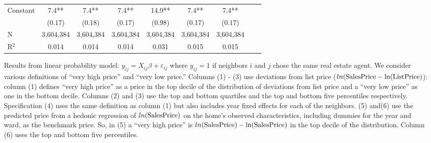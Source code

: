 \documentclass[AEJ,draftmode]{AEA}
\newcommand{\se}[1]{\footnotesize{(#1)}}
\begin{document}
\begin{sidewaystable}[ht]
\begin{tabular}{@{}lcccccccc@{}}
\multirow{2}{*}{Constant}                & 7.4**     & 7.4**     & 7.4**     & 14.9**    & 7.4**     & 7.4**\\
                                         & \se{0.17} & \se{0.18} & \se{0.17} & \se{0.98} & \se{0.17} & \se{0.17}\\\midrule
N                                        & 3,604,384 & 3,604,384 & 3,604,384 & 3,604,384 & 3,604,384 & 3,604,384\\
R$^2$                                    & 0.014     &  0.014    & 0.014     &  0.031    &  0.015    & 0.015 \\\bottomrule
\end{tabular}
\begin{minipage}{.88\hsize}{\footnotesize
    Results from linear probability model:  $y_{ij} = X_{ij} \beta + \varepsilon_{ij}$  where $y_{ij} = 1$ if neighbors $i$ and $j$ chose the same real estate agent.   We consider various definitions of ``very high price'' and ``very low price.'' Columns (1) - (3) use deviations from list price  ($ln(\rm{Sales Price} - ln(\rm{List Price})$): column (1) defines ``very high price'' as a price in the top decile of the distribution of   deviations from list price and a ``very low price'' as one in the bottom decile. Columns (2) and (3) use the top and bottom quartiles and the top   and bottom five percentiles respectively. Specification (4) uses the same definition as column (1) but also includes year fixed effects for each   of the neighbors.    (5) and(6) use the predicted price from a hedonic regression of $ln(\rm{Sales Price})$ on the home's observed characteristics, including dummies  for the year and ward, as the benchmark price. So, in (5) a ``very high price'' is $ln(\rm{Sales Price}) - ln(\rm{Sales Price})$ in the top decile of the distribution. Column (6) uses the top and bottom five percentiles.
}
\end{minipage}
\end{sidewaystable}
\end{document}
